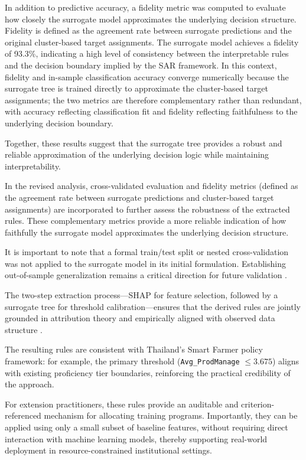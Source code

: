 \documentclass[3p,twocolumn,authoryear]{elsarticle}
\begin{document}
In addition to predictive accuracy, a fidelity metric was computed to
evaluate how closely the surrogate model approximates the underlying
decision structure.
Fidelity is defined as the agreement rate between surrogate predictions
and the original cluster-based target assignments.
The surrogate model achieves a fidelity of 93.3\%, indicating a high
level of consistency between the interpretable rules and the decision
boundary implied by the SAR framework. In this context, fidelity and 
in-sample classification accuracy converge numerically because the surrogate 
tree is trained directly to approximate the cluster-based target assignments; 
the two metrics are therefore complementary rather than redundant, with accuracy 
reflecting classification fit and fidelity reflecting faithfulness to the underlying 
decision boundary.

Together, these results suggest that the surrogate tree provides a
robust and reliable approximation of the underlying decision logic while
maintaining interpretability.

In the revised analysis, cross-validated evaluation and fidelity metrics
(defined as the agreement rate between surrogate predictions and
cluster-based target assignments) are incorporated to further assess the
robustness of the extracted rules.
These complementary metrics provide a more reliable indication of how
faithfully the surrogate model approximates the underlying decision
structure.

It is important to note that a formal train/test split or nested
cross-validation was not applied to the surrogate model in its initial
formulation.
Establishing out-of-sample generalization remains a critical direction
for future validation \citep{guidotti2019}.

The two-step extraction process---SHAP for feature selection, followed
by a surrogate tree for threshold calibration---ensures that the derived
rules are jointly grounded in attribution theory and empirically aligned
with observed data structure \citep{molnar2022}.

The resulting rules are consistent with Thailand's Smart Farmer policy
framework: for example, the primary threshold
(\texttt{Avg\_ProdManage} $\leq 3.675$) aligns with existing
proficiency tier boundaries, reinforcing the practical credibility of
the approach.

For extension practitioners, these rules provide an auditable and
criterion-referenced mechanism for allocating training programs.
Importantly, they can be applied using only a small subset of baseline
features, without requiring direct interaction with machine learning
models, thereby supporting real-world deployment in resource-constrained
institutional settings.
\end{document}
